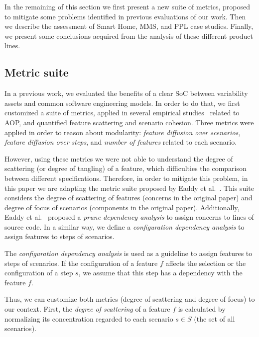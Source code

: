 \documentclass{acm_proc_article-sp}
\begin{document}
In the remaining of this section we first present a new suite of metrics,
proposed to mitigate some problems identified in previous evaluations of our
work. Then we describe the assessment of Smart Home,
MMS, and PPL case studies. Finally, we present some conclusions acquired from
the analysis of these different product lines.

\subsection{Metric suite}\label{sub:metric-suite}

In a previous work, we evaluated the benefits of a clear SoC between variability
assets and common software engineering models. In order to do that, we first
customized a suite of metrics, applied in several empirical
studies~\cite{Garcia:2005aa,Greenwood:2007aa,Figueiredo:2008ab,Figueiredo:2008ab}
related to AOP, and quantified feature scattering and scenario cohesion. Three
metrics were applied in order to reason about modularity: \emph{feature diffusion
over scenarios}, \emph{feature diffusion over steps}, and \emph{number of
features} related to each scenario.

However, using these metrics we were not able to understand the degree of
scattering (or degree of tangling) of a feature, which difficulties the comparison
between different specifications. Therefore, in order to mitigate this problem,
in this paper we are adapting the metric suite proposed by Eaddy et
al.~\cite{Eaddy:2007aa}. This suite considers the degree of scattering of
features (concerns in the original paper) and degree of focus of scenarios
(components in the original paper). Additionally, Eaddy et
al.~\cite{Eaddy:2007aa} proposed a \emph{prune dependency analysis} to assign
concerns to lines of source code. In a similar way, we define a
\emph{configuration dependency analysis} to assign features to steps of
scenarios.

\begin{definition}
The \emph{configuration dependency analysis} is used as a guideline to assign
features to steps of scenarios. If the configuration of a feature $f$
affects the selection or the configuration of a step $s$, we assume that this step has a
dependency with the feature $f$.
\end{definition}

Thus, we can customize both metrics (degree of scattering and degree of focus)
to our context. First, the \emph{degree of scattering} of a feature $f$ is
calculated by normalizing its concentration regarded to each scenario $s \in
S$ (the set of all scenarios).
\end{document}
